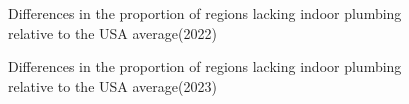 \documentclass[
  letterpaper,
  DIV=11,
  numbers=noendperiod]{scrartcl}
\begin{document}
\begin{figure}[H]


\caption{\label{fig-4}Differences in the proportion of regions lacking
indoor plumbing relative to the USA average(2022)}

\end{figure}%

\begin{figure}[H]


\caption{\label{fig-5}Differences in the proportion of regions lacking
indoor plumbing relative to the USA average(2023)}

\end{figure}%
\end{document}
